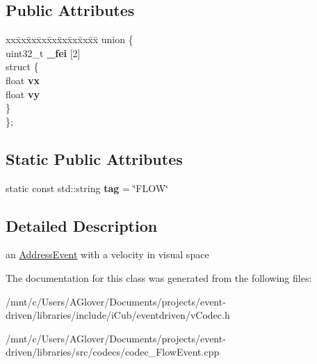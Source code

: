 \subsection*{Public Attributes}
\begin{DoxyCompactItemize}
\item 
\mbox{\label{classev_1_1FlowEvent_a6f7cdf3ec22ead9e2faaebd4a213279f}} 
\begin{tabbing}
xx\=xx\=xx\=xx\=xx\=xx\=xx\=xx\=xx\=\kill
union \{\\
\>uint32\_t {\bfseries \_fei} \mbox{[}2\mbox{]}\\
\mbox{\label{unionev_1_1FlowEvent_1_1_0D9_a174994f064562221bd6c96077d16eeb9}} 
\>struct \{\\
\>\>float {\bfseries vx}\\
\>\>float {\bfseries vy}\\
\>\} \\
\}; \\

\end{tabbing}\end{DoxyCompactItemize}
\subsection*{Static Public Attributes}
\begin{DoxyCompactItemize}
\item 
\mbox{\label{classev_1_1FlowEvent_a583ae9aaa6cbcbe1779eab526b5df1de}} 
static const std\+::string {\bfseries tag} = \char`\"{}F\+L\+OW\char`\"{}
\end{DoxyCompactItemize}


\subsection{Detailed Description}
an \hyperlink{classev_1_1AddressEvent}{Address\+Event} with a velocity in visual space 

The documentation for this class was generated from the following files\+:\begin{DoxyCompactItemize}
\item 
/mnt/c/\+Users/\+A\+Glover/\+Documents/projects/event-\/driven/libraries/include/i\+Cub/eventdriven/v\+Codec.\+h\item 
/mnt/c/\+Users/\+A\+Glover/\+Documents/projects/event-\/driven/libraries/src/codecs/codec\+\_\+\+Flow\+Event.\+cpp\end{DoxyCompactItemize}
